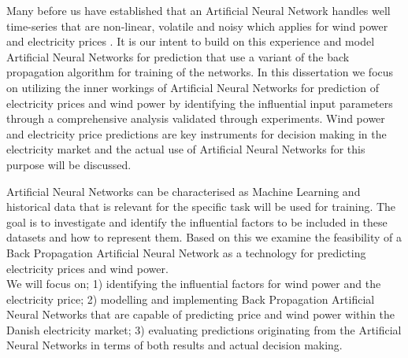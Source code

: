 Many before us have established that an Artificial Neural Network handles well time-series that are non-linear, volatile and noisy which applies for wind power and electricity prices \cite{stockForecasting,pjmForecast,yamin2004adaptive,windForecastPortugal}. It is our intent to build on this experience and model Artificial Neural Networks for prediction that use a variant of the back propagation algorithm for training of the networks. In this dissertation we focus on utilizing the inner workings of Artificial Neural Networks for prediction of electricity prices and wind power by identifying the influential input parameters through a comprehensive analysis validated through experiments. Wind power and electricity price predictions are key instruments for decision making in the electricity market\cite{dayAheadImpactOfWindPowerForecasts,21} and the actual use of Artificial Neural Networks for this purpose will be discussed.  

Artificial Neural Networks can be characterised as Machine Learning\cite{18} and historical data that is relevant for the specific task will be used for training. The goal is to investigate and identify the influential factors to be included in these datasets and how to represent them. Based on this we examine the feasibility of a Back Propagation Artificial Neural Network as a technology for predicting electricity prices and wind power.
\\[0.5cm]
We will focus on; 1) identifying the influential factors for wind power and the electricity price; 2) modelling and implementing Back Propagation Artificial Neural Networks that are capable of predicting price and wind power within the Danish electricity market; 3) evaluating predictions originating from the Artificial Neural Networks in terms of both results and actual decision making.